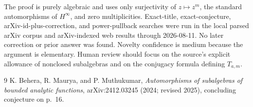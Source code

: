 \documentclass[11pt]{article}
\newcommand{\Hinfty}{H^\infty}
\begin{document}
The proof is purely algebraic and uses only surjectivity of $z\mapsto z^m$,
the standard automorphisms of $\Hinfty$, and zero multiplicities.  Exact-title,
exact-conjecture, arXiv-id-plus-correction, and power-pullback searches were
run in the local parsed arXiv corpus and arXiv-indexed web results through
2026-08-11.  No later correction or prior answer was found.  Novelty confidence
is medium because the argument is elementary.  Human review should focus on
the source's explicit allowance of nonclosed subalgebras and on the conjugacy
formula defining $T_{a,m}$.

\begin{thebibliography}{9}
K. Behera, R. Maurya, and P. Muthukumar,
\emph{Automorphisms of subalgebras of bounded analytic functions},
arXiv:2412.03245 (2024; revised 2025), concluding conjecture on p.~16.
\end{thebibliography}
\end{document}
